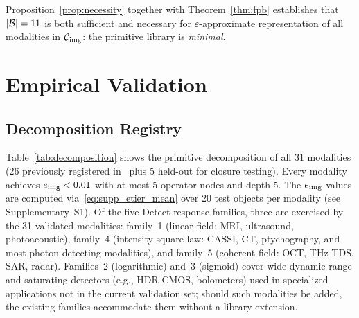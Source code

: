 \documentclass[11pt]{article}
\begin{document}
\begin{remark}
Proposition~\ref{prop:necessity} together with Theorem~\ref{thm:fpb} establishes that $|\mathcal{B}| = 11$ is both sufficient and necessary for $\varepsilon$-approximate representation of all modalities in $\mathcal{C}_{\mathrm{img}}$: the primitive library is \emph{minimal}.
\end{remark}


\section{Empirical Validation}
\label{sec:validation}

\subsection{Decomposition Registry}

Table~\ref{tab:decomposition} shows the primitive decomposition of all 31 modalities (26 previously registered in~\cite{yang2026pwm} plus 5 held-out for closure testing). Every modality achieves $e_{\mathrm{img}} < 0.01$ with at most 5 operator nodes and depth 5. The $e_{\mathrm{img}}$ values are computed via~\eqref{eq:supp_etier_mean} over 20 test objects per modality (see Supplementary~S1). Of the five Detect response families, three are exercised by the 31 validated modalities: family~1 (linear-field: MRI, ultrasound, photoacoustic), family~4 (intensity-square-law: CASSI, CT, ptychography, and most photon-detecting modalities), and family~5 (coherent-field: OCT, THz-TDS, SAR, radar). Families~2 (logarithmic) and~3 (sigmoid) cover wide-dynamic-range and saturating detectors (e.g., HDR CMOS, bolometers) used in specialized applications not in the current validation set; should such modalities be added, the existing families accommodate them without a library extension.
\end{document}
